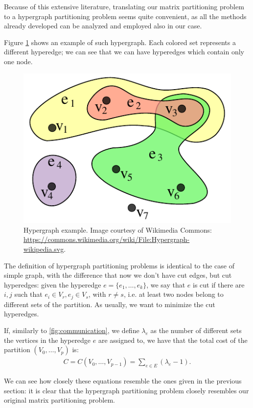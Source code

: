Because of this extensive literature, translating our matrix partitioning problem to a hypergraph partitioning problem seems quite convenient, as all the methods already developed can be analyzed and employed also in our case.

Figure \ref{fig:hypergraph} shows an example of such hypergraph. Each colored set represents a different hyperedge; we can see that we can have hyperedges which contain only one node.

\begin{figure}[h]
	\centering
	\includegraphics{img/hypergraph}
	\caption{Hypergraph example. Image courtesy of Wikimedia Commons: \url{https://commons.wikimedia.org/wiki/File:Hypergraph-wikipedia.svg}.}
	\label{fig:hypergraph}
\end{figure}

The definition of hypergraph partitioning problems is identical to the case of simple graph, with the difference that now we don't have cut edges, but cut hyperedges: given the hyperedge $e=\{e_1,\dots,e_k\}$, we say that $e$ is cut if there are $i,j$ such that $e_i \in V_r, e_j \in V_s$, with $r \neq s$, i.e. at least two nodes belong to different sets of the partition. As usually, we want to minimize the cut hyperedges.

If, similarly to \eqref{fig:communication}, we define $\lambda_e$ as the number of different sets the vertices in the hyperedge $e$ are assigned to, we have that the total cost of the partition $(V_0,\dots,V_p)$ is:
\begin{align}
	C = C(V_0,\dots,V_{p-1}) = \sum_{e \in E} (\lambda_e -1).
	\label{eq:cost_hypergraph}
\end{align}

We can see how closely these equations resemble the ones given in the previous section: it is clear that the hypergraph partitioning problem closely resembles our original matrix partitioning problem.

